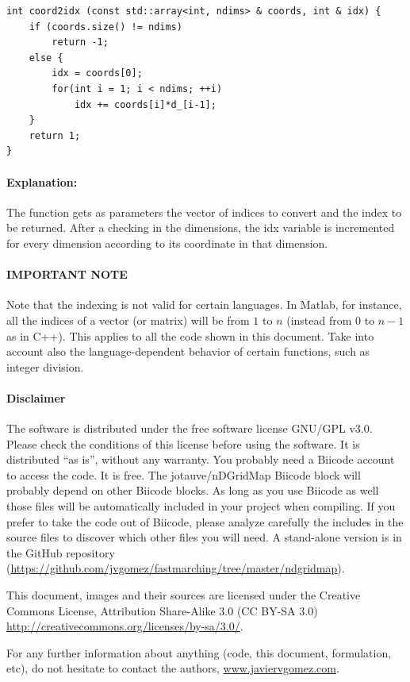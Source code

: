 \documentclass[12pt]{article}
\begin{document}
\begin{lstlisting}
int coord2idx (const std::array<int, ndims> & coords, int & idx) {
	if (coords.size() != ndims)
		return -1;
	else {
		idx = coords[0];
		for(int i = 1; i < ndims; ++i)
			idx += coords[i]*d_[i-1];
	}
	return 1;
}
\end{lstlisting}

\paragraph{Explanation:} The function gets as parameters the vector of indices to convert and the index to be returned. After a checking in the dimensions, the idx variable is incremented for every dimension according to its coordinate in that dimension.

\paragraph{IMPORTANT NOTE} 
Note that the indexing is not valid for certain languages. In Matlab, for instance, all the indices of a vector (or matrix) will be from $1$ to $n$ (instead from $0$ to $n-1$ as in C++). This applies to all the code shown in this document. Take into account also the language-dependent behavior of certain functions, such as integer division.

\paragraph{Disclaimer}
The software is distributed under the free software license GNU/GPL v3.0. Please check the conditions of this license before using the software. It is distributed ``as is'', without any warranty. You probably need a Biicode account to access the code. It is free. The jotauve/nDGridMap Biicode block will probably depend on other Biicode blocks. As long as you use Biicode as well those files will be automatically included in your project when compiling. If you prefer to take the code out of Biicode, please analyze carefully the includes in the source files to discover which other files you will need. A stand-alone version is in the GitHub repository (\url{https://github.com/jvgomez/fastmarching/tree/master/ndgridmap}).

This document, images and their sources are licensed under the Creative Commons License, Attribution Share-Alike 3.0 (CC BY-SA 3.0) \url{http://creativecommons.org/licenses/by-sa/3.0/}.

For any further information about anything (code, this document, formulation, etc), do not hesitate to contact the authors, \url{www.javiervgomez.com}. 
\end{document}
